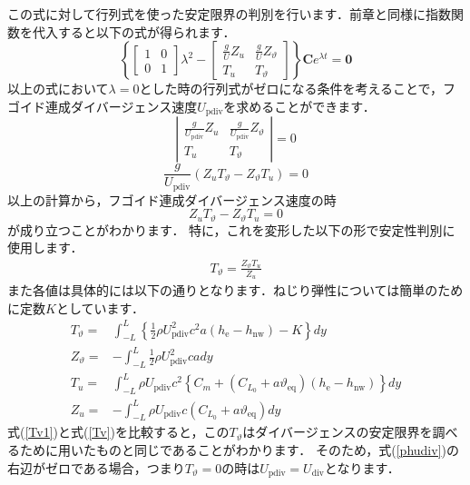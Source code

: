 \documentclass{jarticle}
\begin{document}
この式に対して行列式を使った安定限界の判別を行います．前章と同様に指数関数を代入すると以下の式が得られます．
\begin{equation}
    \left\{
    \begin{bmatrix}
        1 & 0 \\
        0 & 1
    \end{bmatrix}
    \lambda^2
    -
    \begin{bmatrix}
        \frac{g}{U}Z_u & \frac{g}{U}Z_\vartheta \\
        T_u & T_\vartheta
    \end{bmatrix}
    \right\}
    \bm{C}e^{\lambda t}
    =
    \bm{0}
\end{equation}
以上の式において$\lambda=0$とした時の行列式がゼロになる条件を考えることで，フゴイド連成ダイバージェンス速度$U_\mathrm{pdiv}$を求めることができます．
\begin{equation}
    \left|
    \begin{matrix}
        \frac{g}{U_\mathrm{pdiv}}Z_u & \frac{g}{U_\mathrm{pdiv}}Z_\vartheta \\
        T_u & T_\vartheta
    \end{matrix}
    \right|
    =0
\end{equation}
\begin{equation}\label{phudiv2}
    \frac{g}{U_\mathrm{pdiv}} (Z_u T_\vartheta - Z_\vartheta T_u ) = 0
\end{equation}
以上の計算から，フゴイド連成ダイバージェンス速度の時
\begin{equation}
    Z_u T_\vartheta - Z_\vartheta T_u  = 0
\end{equation}
が成り立つことがわかります．
特に，これを変形した以下の形で安定性判別に使用します．
\begin{align}\label{phudiv}
    T_\vartheta = \frac{Z_\vartheta T_u}{Z_u}
\end{align}
また各値は具体的には以下の通りとなります．ねじり弾性については簡単のために定数$K$としています．
\begin{align}
    T_\vartheta =& \int_{-L}^{L} \left\{ \frac{1}{2}\rho U_\mathrm{pdiv}^2 c^2 a  (h_\mathrm{e}-h_\mathrm{nw}) - K \right\} dy \label{Tv1} \\
    Z_\vartheta =& -\int_{-L}^L \frac{1}{2}\rho U_\mathrm{pdiv}^2 c a dy \\
    T_u =& \int_{-L}^L \rho U_\mathrm{pdiv} c^2 \left\{ C_m +  (C_{L_0} + a\vartheta_\mathrm{eq})  (h_\mathrm{e}-h_\mathrm{nw}) \right\} dy \\
    Z_u =& -\int_{-L}^L \rho U_\mathrm{pdiv} c (C_{L_0} + a\vartheta_\mathrm{eq}) dy
\end{align}
式(\ref{Tv1})と式(\ref{Tv})を比較すると，この$T_\vartheta$はダイバージェンスの安定限界を調べるために用いたものと同じであることがわかります．
そのため，式(\ref{phudiv})の右辺がゼロである場合，つまり$T_\vartheta=0$の時は$U_\mathrm{pdiv}=U_\mathrm{div}$となります．
\end{document}
